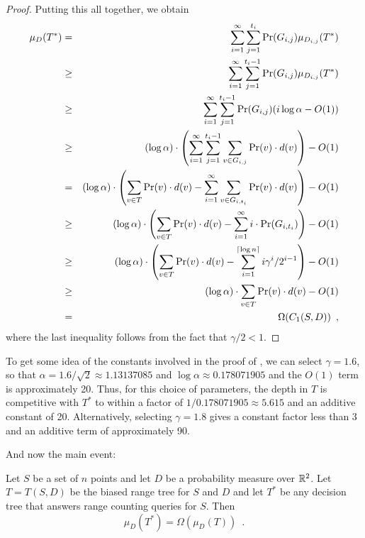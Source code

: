 \documentclass{patmorin}
\newcommand{\depth}{d}
\begin{document}
\begin{proof}
Putting this all together, we obtain
\begin{eqnarray*}
\mu_D(T^*) 
  & = & \sum_{i=1}^{\infty}\sum_{j=1}^{t_i}\Pr(G_{i,j})\mu_{D_{i,j}}(T^*) \\
  & \ge & \sum_{i=1}^{\infty}
    \sum_{j=1}^{t_i-1}\Pr(G_{i,j})\mu_{D_{i,j}}(T^*) \\
  & \ge & \sum_{i=1}^{\infty}\sum_{j=1}^{t_i-1}
           \Pr(G_{i,j})( i\log\alpha -O(1)) \\
  & \ge & (\log\alpha)\cdot
       \left(
         \sum_{i=1}^{\infty}\sum_{j=1}^{t_i-1}
		\sum_{v\in G_{i,j}}\Pr(v)\cdot\depth(v) 
       \right) - O(1)
         \\
  & = & (\log\alpha)\cdot
       \left(\sum_{v\in T}\Pr(v)\cdot \depth(v)
          -    \sum_{i=1}^{\infty}
		\sum_{v\in G_{i,t_i}}\Pr(v)\cdot\depth(v)
       \right) - O(1)\\
  & \ge & (\log\alpha)\cdot
       \left(\sum_{v\in T}\Pr(v)\cdot \depth(v)
          -    \sum_{i=1}^{\infty}i\cdot\Pr(G_{i,t_i})
       \right) - O(1) \\
  & \ge & (\log\alpha)\cdot
       \left(\sum_{v\in T}\Pr(v)\cdot \depth(v)
          -    \sum_{i=1}^{\ceil{\log n}}i\gamma^i/2^{i-1}
       \right) - O(1) \\
  & \ge &  (\log\alpha)\cdot\sum_{v\in T}\Pr(v)\cdot \depth(v) - O(1) \\
  & = & \Omega(C_1(S,D)) \enspace ,
\end{eqnarray*}
where the last inequality follows from the fact that $\gamma/2 < 1$. 
\end{proof}

To get some idea of the constants involved in the proof of
, we can select $\gamma=1.6$, so that
$\alpha=1.6/\sqrt{2}\approx 1.13137085$ and $\log \alpha \approx
0.178071905$ and the $O(1)$ term is approximately 20.  Thus, for this
choice of parameters, the depth in $T$ is competitive with $T^*$ to
within a factor of $1/0.178071905\approx 5.615$ and an additive
constant of 20.  Alternatively, selecting $\gamma=1.8$ gives a
constant factor less than 3 and an additive term of approximately 90.

And now the main event:

\begin{thm}
Let $S$ be a set of $n$ points and let $D$ be a probability measure
over $\mathbb{R}^2$.
Let $T=T(S,D)$ be the biased range tree for $S$ and $D$ and 
let $T^*$ be any decision
tree that answers range counting queries for $S$.  Then
\[
  \mu_D(T^*) = \Omega(\mu_D(T)) \enspace .
\]
\end{thm}
\end{document}
